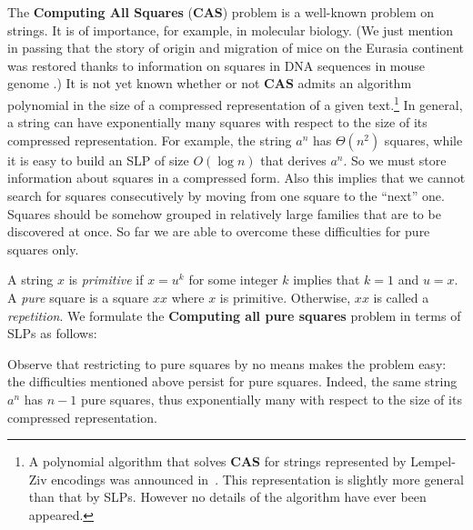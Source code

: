 ﻿\documentclass[11pt]{article}
\begin{document}
The \textbf{Computing All Squares} (\textbf{CAS}) problem is a well-known problem on strings. It is of importance, for
example, in molecular biology. (We just mention in passing that the story of origin and migration of mice on the
Eurasia continent was restored thanks to information on squares in DNA sequences in mouse genome \cite{19}.) It is
not yet known whether or not \textbf{CAS} admits an algorithm polynomial in the size of a compressed representation
of a given text.\footnote{A polynomial algorithm that solves \textbf{CAS} for strings represented by Lempel-Ziv
encodings was announced in~\cite{8}. This representation is slightly more general than that by SLPs. However no
details of the algorithm have ever been appeared.} In general, a string can have exponentially many squares with
respect to the size of its compressed representation. For example, the string $a^n$ has $\Theta(n^2)$ squares,
while it is easy to build an SLP of size $O(\log n)$ that derives $a^n$. So we must store information about
squares in a compressed form. Also this implies that we cannot search for squares consecutively by moving from one
square to the ``next'' one. Squares should be somehow grouped in relatively large families that are to be
discovered at once. So far we are able to overcome these difficulties for pure squares only.

A string $x$ is \emph{primitive} if $x = u^k$ for some integer $k$ implies that $k = 1$ and $u = x$. A \emph{pure}
square is a square $xx$ where $x$ is primitive. Otherwise, $xx$ is called a \emph{repetition}. We formulate the \textbf{
Computing all pure squares} problem in terms of SLPs as follows:


Observe that restricting to pure squares by no means makes the problem easy: the difficulties mentioned above
persist for pure squares. Indeed, the same string $a^n$ has $n-1$ pure squares, thus exponentially many with
respect to the size of its compressed representation.
\end{document}
